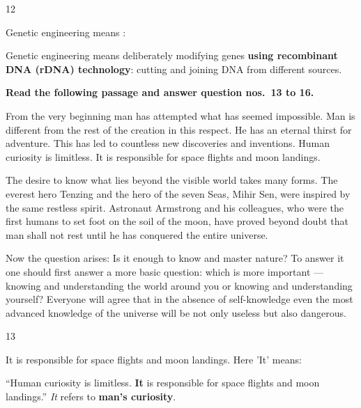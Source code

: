 \begin{question}{12}
{Genetic engineering means :\par}
\begin{explain}
Genetic engineering means deliberately modifying genes \textbf{using recombinant DNA (rDNA) technology}: cutting and joining DNA from different sources.
\end{explain}
\end{question}

\begin{context}
\textbf{Read the following passage and answer question nos.~13 to 16.}\par\smallskip
From the very beginning man has attempted what has seemed impossible. Man is different from the rest of the creation in this respect. He has an eternal thirst for adventure. This has led to countless new discoveries and inventions. Human curiosity is limitless. It is responsible for space flights and moon landings.

The desire to know what lies beyond the visible world takes many forms. The everest hero Tenzing and the hero of the seven Seas, Mihir Sen, were inspired by the same restless spirit. Astronaut Armstrong and his colleagues, who were the first humans to set foot on the soil of the moon, have proved beyond doubt that man shall not rest until he has conquered the entire universe.

Now the question arises: Is it enough to know and master nature? To answer it one should first answer a more basic question: which is more important --- knowing and understanding the world around you or knowing and understanding yourself? Everyone will agree that in the absence of self-knowledge even the most advanced knowledge of the universe will be not only useless but also dangerous.
\end{context}
\begin{question}{13}
{It is responsible for space flights and moon landings. Here 'It' means:\par}
\begin{explain}
``Human curiosity is limitless. \textbf{It} is responsible for space flights and moon landings.'' \emph{It} refers to \textbf{man's curiosity}.
\end{explain}
\end{question}


